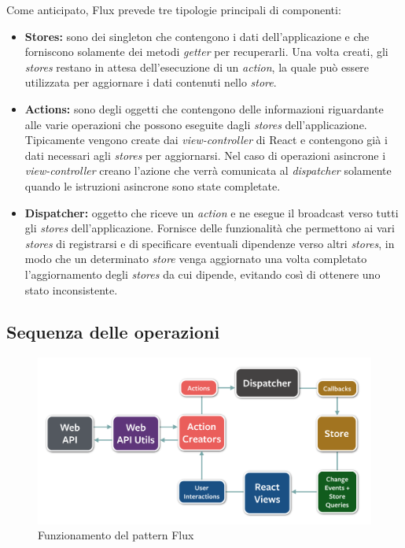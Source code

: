 Come anticipato, Flux prevede tre tipologie principali di componenti:
\begin{itemize}
\item \textbf{Stores:} sono dei \gls{singleton} che contengono i dati dell'applicazione e che forniscono solamente dei metodi \textit{getter} per recuperarli. Una volta creati, gli \textit{stores} restano in attesa dell'esecuzione di un \textit{action}, la quale può essere utilizzata per aggiornare i dati contenuti nello \textit{store}.
\item \textbf{Actions:} sono degli oggetti che contengono delle informazioni riguardante alle varie operazioni che possono eseguite dagli \textit{stores} dell'applicazione. Tipicamente vengono create dai \textit{view-controller} di React e contengono già i dati necessari agli \textit{stores} per aggiornarsi. Nel caso di operazioni asincrone i \textit{view-controller} creano l'azione che verrà comunicata al \textit{dispatcher} solamente quando le istruzioni asincrone sono state completate.
\item \textbf{Dispatcher:} oggetto che riceve un \textit{action} e ne esegue il broadcast verso tutti gli \textit{stores} dell'applicazione. Fornisce delle funzionalità che permettono ai vari \textit{stores} di registrarsi e di specificare eventuali dipendenze verso altri \textit{stores}, in modo che un determinato \textit{store} venga aggiornato una volta completato l'aggiornamento degli \textit{stores} da cui dipende, evitando così di ottenere uno stato inconsistente.
\end{itemize}

\subsection{Sequenza delle operazioni}

\begin{figure}[htp]
\centering
\includegraphics[width=\textwidth*3/4]{../immagini/flux-diagram}
\caption{Funzionamento del pattern Flux}  
\end{figure}
\FloatBarrier

